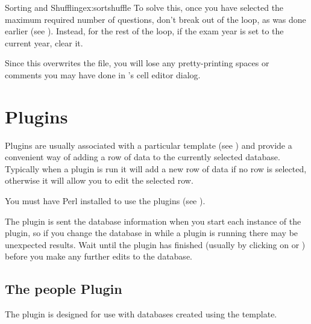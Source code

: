 \begin{example}{Sorting and Shuffling}{ex:sortshuffle}
To solve this, once you have selected the maximum required number of
questions, don't break out of the loop, as was done earlier (see
). Instead, for the rest of the loop, if the exam
year is set to the current year, clear it.


\begin{information}
Since this overwrites the  file, you will
lose any pretty-printing spaces or comments you may have done in 
's cell editor dialog.
\end{information}

\end{example}

\section{Plugins}\label{sec:plugins}

   Plugins are usually associated with a particular template 
   (see ) and provide a convenient way of
   adding a row of data to the currently selected database.
   Typically when a plugin is run it will add a new row of data 
   if no row is selected, otherwise it will allow you to edit the selected row.

   \begin{important}
   You must have Perl installed to use the plugins (see 
   ). 
   \end{important}

   \begin{warning}
   The plugin is sent the database information when you start each instance of 
   the plugin, so if you change the database in  while 
   a plugin is running there may be unexpected results. 
   Wait until the plugin has finished 
   (usually by clicking on  or 
   ) before you make any further edits to the database.
   \end{warning}


\subsection{The people Plugin}\label{sec:peopleplugin}

   The  plugin is designed for use with databases created
   using the  template.


